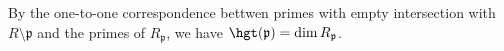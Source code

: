 By the one-to-one correspondence bettwen primes with empty intersection with $R\setminus \mathfrak{p}$
and the primes of $R_{\mathfrak{p}}$, we have $\hgt(\mathfrak{p}) = \dim R_{\mathfrak{p}}$.
